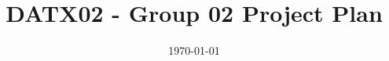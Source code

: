 

\title{DATX02 - Group 02 Project Plan}
\author{\groupmembers}
\date{\today}


\maketitle

\thispagestyle{empty}
\clearpage

\thispagestyle{empty}
\clearpage











